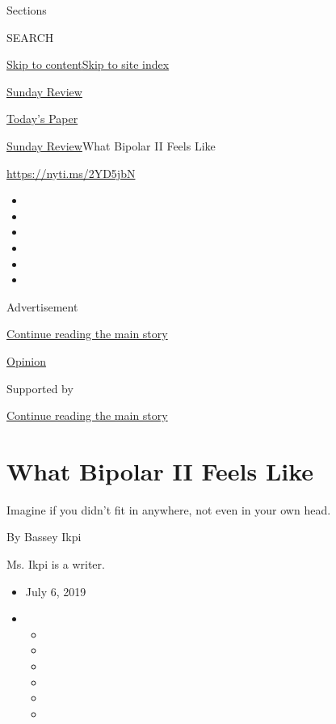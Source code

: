 Sections

SEARCH

\protect\hyperlink{site-content}{Skip to
content}\protect\hyperlink{site-index}{Skip to site index}

\href{https://www.nytimes3xbfgragh.onion/section/opinion/sunday}{Sunday
Review}

\href{https://myaccount.nytimes3xbfgragh.onion/auth/login?response_type=cookie\&client_id=vi}{}

\href{https://www.nytimes3xbfgragh.onion/section/todayspaper}{Today's
Paper}

\href{/section/opinion/sunday}{Sunday Review}\textbar{}What Bipolar II
Feels Like

\url{https://nyti.ms/2YD5jbN}

\begin{itemize}
\item
\item
\item
\item
\item
\item
\end{itemize}

Advertisement

\protect\hyperlink{after-top}{Continue reading the main story}

\href{/section/opinion}{Opinion}

Supported by

\protect\hyperlink{after-sponsor}{Continue reading the main story}

\hypertarget{what-bipolar-ii-feels-like}{%
\section{What Bipolar II Feels Like}\label{what-bipolar-ii-feels-like}}

Imagine if you didn't fit in anywhere, not even in your own head.

By Bassey Ikpi

Ms. Ikpi is a writer.

\begin{itemize}
\item
  July 6, 2019
\item
  \begin{itemize}
  \item
  \item
  \item
  \item
  \item
  \item
  \end{itemize}
\end{itemize}

